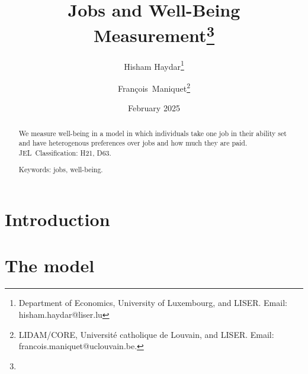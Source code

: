 \documentclass[12pt]{article}
\begin{document}
\title{Jobs and Well-Being Measurement\thanks{%
}}
\author{Hisham Haydar\thanks{%
Department of Economics, University of Luxembourg, and LISER. Email: hisham.haydar@liser.lu} \and Fran\c{c}ois\
Maniquet\thanks{%
LIDAM/CORE, Universit\'{e} catholique de Louvain, and LISER. Email:
francois.maniquet@uclouvain.be.}}
\date{February 2025}
\maketitle

\begin{abstract}
We measure well-being in a model in which individuals take one job in their ability set and have heterogenous preferences over jobs and how much they are paid.
  \\


JEL\ Classification: H21, D63.

Keywords: jobs, well-being.
\end{abstract}

\section{Introduction}

\section{The model}
\end{document}
